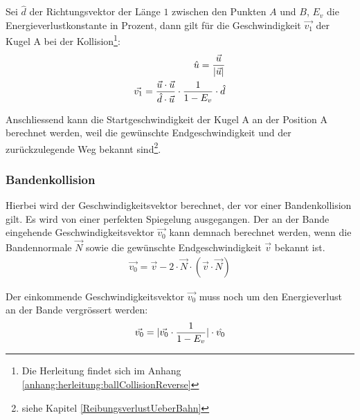 Sei $\hat{d}$ der Richtungsvektor der Länge $1$ zwischen den Punkten $A$ und $B$, $E_v$ die Energieverlustkonstante in
Prozent, dann gilt für die Geschwindigkeit $\vec{v_1}$ der Kugel A bei der Kollision\footnote{Die Herleitung findet sich im Anhang \ref{anhang:herleitung:ballCollisionReverse}}:
\begin{align}
    \hat{u} = \frac{\vec{u}}{\lvert \vec{u} \rvert}\\
    \vec{v_1} = \frac{\vec{u} \cdot \vec{u}}{\hat{d} \cdot \vec{u}} \cdot \frac{1}{1 - E_v} \cdot \hat{d}
\end{align}

Anschliessend kann die Startgeschwindigkeit der Kugel A an der Position A berechnet werden, weil die gewünschte
Endgeschwindigkeit und der zurückzulegende Weg bekannt sind\footnote{siehe Kapitel \ref{ReibungsverlustUeberBahn}}.

\subsubsection{Bandenkollision}

Hierbei wird der Geschwindigkeitsvektor berechnet, der vor einer Bandenkollision gilt.
Es wird von einer perfekten Spiegelung ausgegangen. Der an der Bande eingehende
Geschwindigkeitsvektor $\vec{v_0}$ kann demnach berechnet werden, wenn die Bandennormale $\vec{N}$ sowie die
gewünschte Endgeschwindigkeit $\vec{v}$ bekannt ist.
\begin{align}
    \vec{v_0} = \vec{v} - 2 \cdot \vec{N} \cdot (\vec{v} \cdot \vec{N})
\end{align}

Der einkommende Geschwindigkeitsvektor $\vec{v_0}$ muss noch um den Energieverlust an der Bande vergrössert werden:
\begin{align}
    \vec{v_0} = \lvert \vec{v_0} \cdot \frac{1}{1 - E_v} \rvert \cdot \hat{v_0}
\end{align}